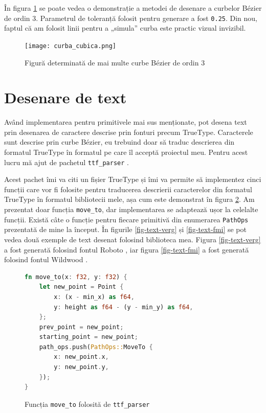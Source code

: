 \documentclass[a4paper, 12pt]{report}
\begin{document}
În figura \ref{fig-cubic-example} se poate vedea o demonstrație a metodei de desenare a curbelor Bézier de ordin 3.
Parametrul de toleranță folosit pentru generare a fost \texttt{0.25}. Din nou, faptul că am folosit linii pentru a „simula”
curba este practic vizual invizibil.

\begin{figure}[ht]
    \texttt{[image: curba\_cubica.png]}
    \centering
    \caption{Figură determinată de mai multe curbe Bézier de ordin 3}
    \label{fig-cubic-example}
\end{figure}

\newpage

\section{Desenare de text}

Având implementarea pentru primitivele mai sus menționate, pot desena text prin desenarea de caractere descrise prin
fonturi precum TrueType. Caracterele sunt descrise prin curbe Bézier, eu trebuind doar să traduc descrierea din formatul
TrueType în formatul pe care îl acceptă proiectul meu. Pentru acest lucru mă ajut de pachetul \texttt{ttf\_parser}
\cite{TrueTypeParser}.

Acest pachet îmi va citi un fișier TrueType și îmi va permite să implementez cinci funcții care vor fi folosite pentru
traducerea descrierii caracterelor din formatul TrueType în formatul bibliotecii mele, așa cum este demonstrat în figura
\ref{fig-ttf-parser-demo}. Am prezentat doar funcția \texttt{move\_to}, dar implementarea se adaptează ușor la celelalte funcții.
Există câte o funcție pentru fiecare primitivă din enumerarea \texttt{PathOps} prezentată de mine la început. În figurile
\ref{fig-text-verg} și \ref{fig-text-fmi} se pot vedea două exemple de text desenat folosind biblioteca mea. Figura
\ref{fig-text-verg} a fost generată folosind fontul Roboto \cite{Roboto}, iar figura \ref{fig-text-fmi} a fost generată
folosind fontul Wildwood \cite{Wildwood}.

\begin{figure}[ht]
    \centering
    \begin{lstlisting}[language=Rust]
fn move_to(x: f32, y: f32) {
    let new_point = Point {
        x: (x - min_x) as f64,
        y: height as f64 - (y - min_y) as f64,
    };
    prev_point = new_point;
    starting_point = new_point;
    path_ops.push(PathOps::MoveTo {
        x: new_point.x,
        y: new_point.y,
    });
}
    \end{lstlisting}
    \caption{Funcția \texttt{move\_to} folosită de \texttt{ttf\_parser}}
    \label{fig-ttf-parser-demo}
\end{figure}
\end{document}
